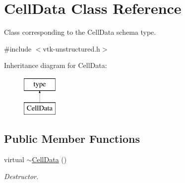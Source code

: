 \hypertarget{classCellData}{}\section{Cell\+Data Class Reference}
\label{classCellData}


Class corresponding to the Cell\+Data schema type.  




{\ttfamily \#include $<$vtk-\/unstructured.\+h$>$}

Inheritance diagram for Cell\+Data\+:\begin{figure}[H]
\begin{center}
\leavevmode
\includegraphics[height=2.000000cm]{classCellData}
\end{center}
\end{figure}
\subsection*{Public Member Functions}
\begin{DoxyCompactItemize}
\item 
virtual \hyperlink{classCellData_aaf439852120aadb5a267799e2a7bf2a3}{$\sim$\+Cell\+Data} ()
\begin{DoxyCompactList}\small\item\em Destructor. \end{DoxyCompactList}\end{DoxyCompactItemize}
